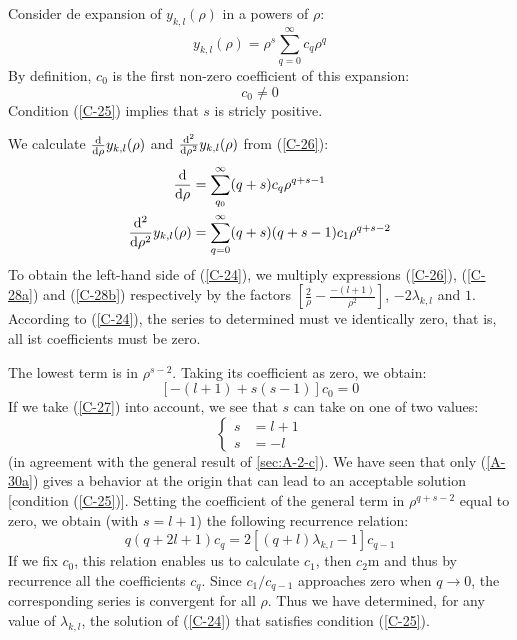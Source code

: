 \begin{itemize}
	Consider de expansion of $y_{k,l}(\rho)$ in a powers of $\rho$:
	\begin{equation}\label{C-26}
	y_{k,l}(\rho)=\rho^s\sum_{q=0}^\infty c_q\rho^q
\end{equation}
By definition, $c_0$ is the first non-zero coefficient of this expansion:
\begin{equation}\label{C-27}
	c_0\neq 0
\end{equation}
Condition (\ref{C-25}) implies that $s$ is stricly positive.

We calculate $\dv{\rho}y_{k,l}(\rho)$ and $\dv[2]{\rho}y_{k,l}(\rho)$ from (\ref{C-26}):
\begin{align}
	\label{C-28a}\dv{\rho}&=\sum_{q_0}^\infty (q+s)c_q\rho^{q+s-1}\\
	\dv[2]{\rho}y_{k,l}(\rho)&=\sum_{q=0}^\infty (q+s)(q+s-1)c_1\rho^{q+s-2}\label{C-28b}
\end{align}
To obtain the left-hand side of (\ref{C-24}), we multiply expressions (\ref{C-26}), (\ref{C-28a}) and (\ref{C-28b}) respectively by the factors $\left[\frac{2}{\rho}-\frac{-(l+1)}{\rho^2}\right]$, $-2\lambda_{k,l}$ and $1$. According to (\ref{C-24}), the series to determined must ve identically zero, that is, all ist coefficients must be zero.

The lowest term is in $\rho^{s-2}$. Taking its coefficient as zero, we obtain:
\begin{equation}\label{C-29}
	[-(l+1)+s(s-1)]c_0=0
\end{equation}
If we take (\ref{C-27}) into account, we see that $s$ can take on one of two values:
\begin{equation}\label{C-30}
	\left \{
		\begin{array}{cc}
			s&=l+1\\
			s&=-l
		\end{array}
	\right.
\end{equation}
(in agreement with the general result of \ref{sec:A-2-c}). We have seen that only (\ref{A-30a}) gives a behavior at the origin that can lead to an acceptable solution [condition (\ref{C-25})]. Setting the coefficient of the general term in $\rho^{q+s-2}$ equal to zero, we obtain (with $s=l+1$) the following recurrence relation:
\begin{equation}\label{C-31}
	q(q+2l+1)c_q=2[(q+l)\lambda_{k,l}-1]c_{q-1}
\end{equation}
If we fix $c_0$, this relation enables us to calculate $c_1$, then $c_2$m and thus by recurrence all the coefficients $c_q$. Since $c_1/c_{q-1}$ approaches zero when $q\to 0$, the corresponding series is convergent for all $\rho$. Thus we have determined, for any value of $\lambda_{k,l}$, the solution of (\ref{C-24}) that satisfies condition (\ref{C-25}).
\end{itemize}

